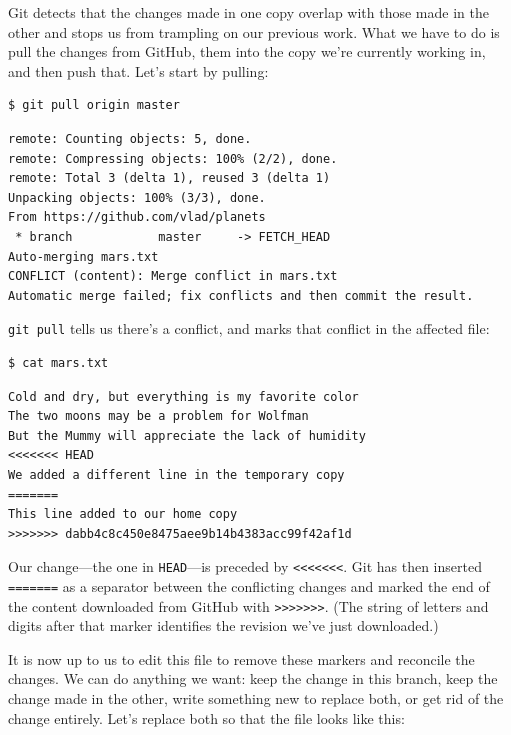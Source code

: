 \documentclass{book}
\begin{document}
Git detects that the changes made in one copy overlap with those made in
the other and stops us from trampling on our previous work. What we have
to do is pull the changes from GitHub,
 them into the copy we're currently
working in, and then push that. Let's start by pulling:

\begin{verbatim}
$ git pull origin master
\end{verbatim}

\begin{verbatim}
remote: Counting objects: 5, done.
remote: Compressing objects: 100% (2/2), done.
remote: Total 3 (delta 1), reused 3 (delta 1)
Unpacking objects: 100% (3/3), done.
From https://github.com/vlad/planets
 * branch            master     -> FETCH_HEAD
Auto-merging mars.txt
CONFLICT (content): Merge conflict in mars.txt
Automatic merge failed; fix conflicts and then commit the result.
\end{verbatim}

\texttt{git pull} tells us there's a conflict, and marks that conflict
in the affected file:

\begin{verbatim}
$ cat mars.txt
\end{verbatim}

\begin{verbatim}
Cold and dry, but everything is my favorite color
The two moons may be a problem for Wolfman
But the Mummy will appreciate the lack of humidity
<<<<<<< HEAD
We added a different line in the temporary copy
=======
This line added to our home copy
>>>>>>> dabb4c8c450e8475aee9b14b4383acc99f42af1d
\end{verbatim}

Our change---the one in \texttt{HEAD}---is preceded by
\texttt{\textless{}\textless{}\textless{}\textless{}\textless{}\textless{}\textless{}}.
Git has then inserted \texttt{=======} as a separator between the
conflicting changes and marked the end of the content downloaded from
GitHub with
\texttt{\textgreater{}\textgreater{}\textgreater{}\textgreater{}\textgreater{}\textgreater{}\textgreater{}}.
(The string of letters and digits after that marker identifies the
revision we've just downloaded.)

It is now up to us to edit this file to remove these markers and
reconcile the changes. We can do anything we want: keep the change in
this branch, keep the change made in the other, write something new to
replace both, or get rid of the change entirely. Let's replace both so
that the file looks like this:
\end{document}

